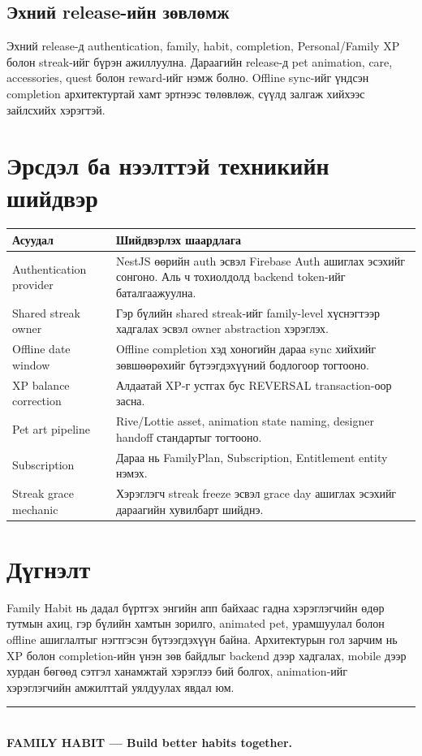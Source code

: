 \documentclass[12pt,a4paper,oneside]{report}
\begin{document}
\section{Эхний release-ийн зөвлөмж}
Эхний release-д authentication, family, habit, completion, Personal/Family XP болон streak-ийг бүрэн ажиллуулна. Дараагийн release-д pet animation, care, accessories, quest болон reward-ийг нэмж болно. Offline sync-ийг үндсэн completion архитектуртай хамт эртнээс төлөвлөж, сүүлд залгаж хийхээс зайлсхийх хэрэгтэй.

\chapter{Эрсдэл ба нээлттэй техникийн шийдвэр}

\begin{longtable}{p{}p{}}
\toprule
\textbf{Асуудал} & \textbf{Шийдвэрлэх шаардлага}\\
\midrule
Authentication provider & NestJS өөрийн auth эсвэл Firebase Auth ашиглах эсэхийг сонгоно. Аль ч тохиолдолд backend token-ийг баталгаажуулна.\\
Shared streak owner & Гэр бүлийн shared streak-ийг family-level хүснэгтээр хадгалах эсвэл owner abstraction хэрэглэх.\\
Offline date window & Offline completion хэд хоногийн дараа sync хийхийг зөвшөөрөхийг бүтээгдэхүүний бодлогоор тогтооно.\\
XP balance correction & Алдаатай XP-г устгах бус REVERSAL transaction-оор засна.\\
Pet art pipeline & Rive/Lottie asset, animation state naming, designer handoff стандартыг тогтооно.\\
Subscription & Дараа нь FamilyPlan, Subscription, Entitlement entity нэмэх.\\
Streak grace mechanic & Хэрэглэгч streak freeze эсвэл grace day ашиглах эсэхийг дараагийн хувилбарт шийднэ.\\
\bottomrule
\end{longtable}

\chapter*{Дүгнэлт}
Family Habit нь дадал бүртгэх энгийн апп байхаас гадна хэрэглэгчийн өдөр тутмын ахиц, гэр бүлийн хамтын зорилго, animated pet, урамшуулал болон offline ашиглалтыг нэгтгэсэн бүтээгдэхүүн байна. Архитектурын гол зарчим нь XP болон completion-ийн үнэн зөв байдлыг backend дээр хадгалах, mobile дээр хурдан бөгөөд сэтгэл ханамжтай хэрэглээ бий болгох, animation-ийг хэрэглэгчийн амжилттай уялдуулах явдал юм.

\vfill
\begin{center}
\textcolor{primary}{\rule{0.55\textwidth}{1pt}}\\
\textbf{FAMILY HABIT — Build better habits together.}
\end{center}
\end{document}
